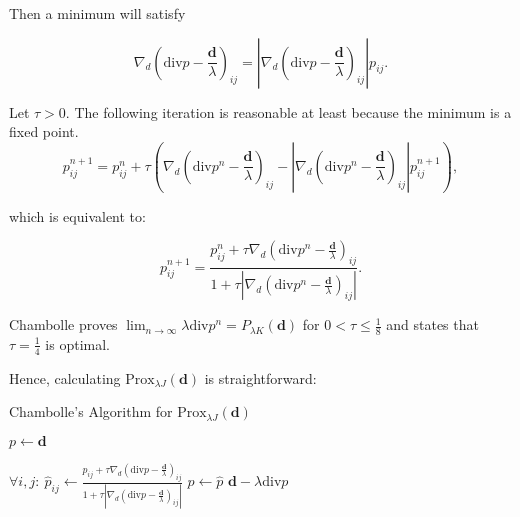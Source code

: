 \documentclass[paper=a4, fontsize=11pt]{scrartcl} %
\numberwithin{equation}{section} %
\numberwithin{figure}{section} %
\numberwithin{table}{section} %
\newcommand{\data}{\mathbf{d}}
\newcommand{\prox}{\text{Prox}}
\newcommand{\grad}{\nabla_{d} }
\newcommand{\divg}{\text{div}}
\begin{document}
Then a minimum will satisfy

\begin{equation*}
  \grad \left ( \divg p - \frac{\data}{\lambda} \right )_{ij} = \left
  |\grad \left ( \divg p - \frac{\data}{\lambda} \right )_{ij} \right
  | p_{ij}.
\end{equation*}

Let $\tau > 0$. The following iteration is reasonable at least because
the minimum is a fixed point.
\begin{equation}
  p_{ij}^{n+1} = p_{ij}^{n} + \tau \left ( \grad \left (\divg p^{n} -
    \frac{\data}{\lambda} \right )_{ij} - \left | \grad \left (\divg p^{n} -
    \frac{\data}{\lambda} \right )_{ij} \right | p_{ij}^{n+1} \right ),
\end{equation}

which is equivalent to:

\begin{equation}
p_{ij}^{n+1} = \frac{p_{ij}^{n} + \tau \grad \left (\divg p^{n} - \frac{\data}{\lambda} \right )_{ij}}
{1+ \tau \left | \grad \left ( \divg p^{n} - \frac{\data}{\lambda}\right )_{ij}  \right | }.
\end{equation}

Chambolle \cite[Theorem 3.1]{chambolle2004algorithm} proves $\lim_{n \to \infty} \lambda
\divg p^n = P_{\lambda K}(\data)$ for $0 < \tau \leq \frac{1}{8}$ and
states that $\tau = \frac{1}{4}$ is optimal.

Hence, calculating $\prox_{\lambda J}(\data)$ is straightforward:

\begin{algorithm}
  \caption{Chambolle's Algorithm for $\prox_{\lambda J}(\data)$}\label{alg:chambolle}
  \begin{algorithmic}
    \Function{Chambolle}{$\data, \lambda$}
    \State $p \gets \data$

    \State $\forall i,j:\ \hat{p}_{ij} \gets \frac{p_{ij} + \tau \grad (\divg p - \frac{\data}{\lambda})_{ij}}
    {1+ \tau | \grad (\divg p - \frac{\data}{\lambda})_{ij}|}$
    \State $p \gets \hat{p}$
    \EndFor
    \Return $\data - \lambda \divg p$
  \end{algorithmic}
\end{algorithm}


\end{document}
